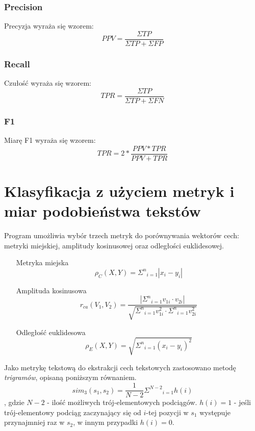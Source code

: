 \documentclass{classrep}
\begin{document}
\subsubsection{Precision}
Precyzja wyraża się wzorem:
\begin{equation}
PPV=\frac{\Sigma TP}{\Sigma TP + \Sigma FP} \label{eq:eps}
\end{equation}
\subsubsection{Recall}
Czułość wyraża się wzorem:
\begin{equation}
TPR=\frac{\Sigma TP}{\Sigma TP + \Sigma FN} \label{eq:eps}
\end{equation}
\subsubsection{F1}
Miarę F1 wyraża się wzorem:
\begin{equation}
TPR=2*\frac{PPV*TPR}{PPV + TPR} \label{eq:eps}
\end{equation}


\section{Klasyfikacja z użyciem metryk i miar podobieństwa tekstów}
Program umożliwia wybór trzech metryk do porównywania wektorów cech: metryki miejskiej, amplitudy kosinusowej oraz odległości euklidesowej.
\begin{enumerate}
\item[Metryka miejska]{\begin{equation}
\rho_{C}(X,Y) = {{\Sigma}^{n}}_{i=1} |x_i-y_i|\label{eq:eps}
\end{equation}}
\item[Amplituda kosinusowa]{\begin{equation}
r_{ca}(V_1,V_2) = \frac{|{{\Sigma}^{n}}_{i=1} v_{1i}\cdot v_{2i}|}{\sqrt{{{\Sigma}^{n}}_{i=1} v_{1i}^2 \cdot {{\Sigma}^{n}}_{i=1} v_{2i}^2}}\label{eq:eps}
\end{equation}}
\item[Odległość euklidesowa]{\begin{equation}
\rho_{E}(X,Y) = \sqrt{{{\Sigma}^{n}}_{i=1} (x_i-y_i)^2}\label{eq:eps}
\end{equation}}
\end{enumerate}

Jako metrykę tekstową do ekstrakcji cech tekstowych zastosowano metodę \textit{trigramów}, opisaną poniższym równaniem.
\begin{equation}
sim_{3}(s_1,s_2) = \frac{1}{N-2} {{\Sigma}^{N-2}}_{i=1} h(i)\label{eq:eps}
\end{equation}
\newline , gdzie
\newline $N-2$ - ilość możliwych trój-elementowych podciągów.
\newline $h(i) = 1$ - jeśli trój-elementowy podciąg zaczynający się od $i$-tej pozycji w $s_1$ występuje przynajmniej raz w $s_2$, w innym przypadki $h(i)=0$.
\end{document}
